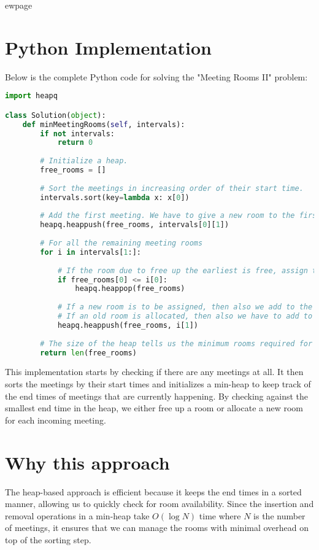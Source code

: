 ewpage %
\section*{Python Implementation}
Below is the complete Python code for solving the "Meeting Rooms II" problem:

\begin{fullwidth}
\begin{lstlisting}[language=Python]
import heapq

class Solution(object):
    def minMeetingRooms(self, intervals):
        if not intervals:
            return 0
        
        # Initialize a heap.
        free_rooms = []
        
        # Sort the meetings in increasing order of their start time.
        intervals.sort(key=lambda x: x[0])
        
        # Add the first meeting. We have to give a new room to the first meeting.
        heapq.heappush(free_rooms, intervals[0][1])
        
        # For all the remaining meeting rooms
        for i in intervals[1:]:
            
            # If the room due to free up the earliest is free, assign that room to this meeting.
            if free_rooms[0] <= i[0]:
                heapq.heappop(free_rooms)
            
            # If a new room is to be assigned, then also we add to the heap.
            # If an old room is allocated, then also we have to add to the heap with updated end time.
            heapq.heappush(free_rooms, i[1])
        
        # The size of the heap tells us the minimum rooms required for all the meetings.
        return len(free_rooms)

\end{lstlisting}

\end{fullwidth}

This implementation starts by checking if there are any meetings at all. It then sorts the meetings by their start times and initializes a min-heap to keep track of the end times of meetings that are currently happening. By checking against the smallest end time in the heap, we either free up a room or allocate a new room for each incoming meeting.

\section*{Why this approach}
The heap-based approach is efficient because it keeps the end times in a sorted manner, allowing us to quickly check for room availability. Since the insertion and removal operations in a min-heap take \(O(\log N)\) time where \(N\) is the number of meetings, it ensures that we can manage the rooms with minimal overhead on top of the sorting step. 

